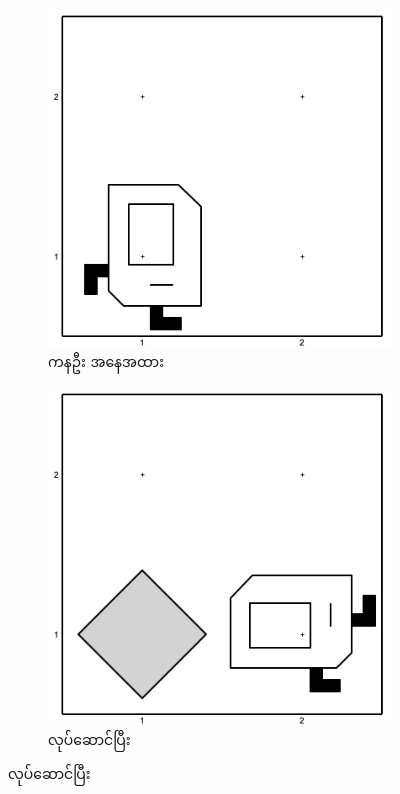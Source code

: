 \begin{sloppypar}
\begin{figure}[tbh!]
    \caption{}
    \begin{subfigure}[t]{0.46\textwidth}
        \includegraphics[scale=0.17, left]{ch02/MakeBeeperSquare/init.jpg}
        \caption{ကနဦး အနေအထား}
        \label{subfig:MakeBeeperSquareInit}
    \end{subfigure}
    \hspace{0.1in}
    \begin{subfigure}[t]{0.46\textwidth}
        \includegraphics[scale=0.17, left]{ch02/MakeBeeperSquare/1st_iter.jpg}
        \caption{ \mmcommand လုပ်ဆောင်ပြီး}
    \end{subfigure}


\end{figure}
\end{sloppypar}
